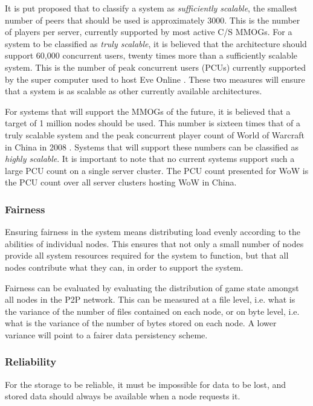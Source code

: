\documentclass[10pt,a4paper,journal,cspaper,compsoc]{IEEEtran}
\begin{document}
It is put proposed that to classify a system as \emph{sufficiently scalable}, the smallest number of peers that should be used is approximately 3000.
This is the number of players per server, currently supported by most active C/S MMOGs. For a system to be classified as \emph{truly scalable}, it is
believed that the architecture should support 60,000 concurrent users, twenty times more than a sufficiently scalable system. This is the number of
peak concurrent users (PCUs) currently supported by the super computer used to host Eve Online \cite{eve_pcu}. These two measures will ensure that a
system is as scalable as other currently available architectures.

For systems that will support the MMOGs of the future, it is believed that a target of 1 million nodes should be used. This number is sixteen times
that of a truly scalable system and the peak concurrent player count of World of Warcraft in China in 2008 \cite{WoW_china_pcu}. Systems that will
support these numbers can be classified as \emph{highly scalable}. It is important to note that no current systems support such a large PCU count on
a single server cluster. The PCU count presented for WoW is the PCU count over all server clusters hosting WoW in China.

\subsubsection{Fairness}
Ensuring fairness in the system means distributing load evenly according to the abilities of individual nodes. This ensures that not only a small
number of nodes provide all system resources required for the system to function, but that all nodes contribute what they can, in order to support
the system.

Fairness can be evaluated by evaluating the distribution of game state amongst all nodes in the P2P network. This can be measured at a file level,
i.e. what is the variance of the number of files contained on each node, or on byte level, i.e. what is the variance of the number of bytes stored on
each node. A lower variance will point to a fairer data persistency scheme.

\subsubsection{Reliability}
For the storage to be reliable, it must be impossible for data to be lost, and stored data should always be available when a node requests it.
\end{document}
